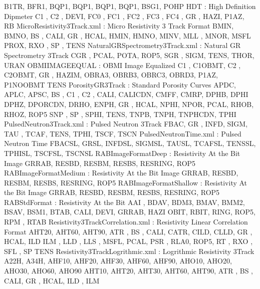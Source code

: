 \documentclass[letterpaper,10pt,english]{sphinxmanual}
\begin{document}
\begin{sphinxVerbatim}[commandchars=\\\{\}]
    B1TR, BFR1, BQP1, BQP1, BQP1, BQP1, BSG1, POHP
HDT                                 : High Definition Dipmeter
    C1  , C2  , DEVI, FC0 , FC1 , FC2 , FC3 , FC4 , GR  , HAZI, P1AZ, RB
Micro\PYGZus{}Resistivity\PYGZus{}3Track.xml        : Micro Resistivity 3 Track Format
    BMIN, BMNO, BS  , CALI, GR  , HCAL, HMIN, HMNO, MINV, MLL , MNOR, MSFL
    PROX, RXO , SP  , TENS
Natural\PYGZus{}GR\PYGZus{}Spectrometry\PYGZus{}3Track.xml  : Natural GR Spectrometry 3Track
    CGR , PCAL, POTA, ROP5, SGR , SIGM, TENS, THOR, URAN
OBMI\PYGZus{}IMAGE\PYGZus{}EQUAL                    : OBMI Image Equalized
    C1  , C1\PYGZus{}OBMT, C2  , C2\PYGZus{}OBMT, GR  , HAZIM, OBRA3, OBRB3, OBRC3, OBRD3, P1AZ, P1NO\PYGZus{}OBMT
    TENS
Porosity\PYGZus{}GR\PYGZus{}3Track                  : Standard Porosity Curves
    APDC, APLC, APSC, BS  , C1  , C2  , CALI, CALI\PYGZus{}CDN, CMFF, CMRP, DPHB, DPHI
    DPHZ, DPOR\PYGZus{}CDN, DRHO, ENPH, GR  , HCAL, NPHI, NPOR, PCAL, RHOB, RHOZ, ROP5
    SNP , SP  , SPHI, TENS, TNPB, TNPH, TNPH\PYGZus{}CDN, TPHI
Pulsed\PYGZus{}Neutron\PYGZus{}3Track.xml           : Pulsed Neutron 3Track
    FBAC, GR  , INFD, SIGM, TAU , TCAF, TENS, TPHI, TSCF, TSCN
Pulsed\PYGZus{}Neutron\PYGZus{}Time.xml             : Pulsed Neutron Time
    FBAC\PYGZus{}SL, GR\PYGZus{}SL, INFD\PYGZus{}SL, SIGM\PYGZus{}SL, TAU\PYGZus{}SL, TCAF\PYGZus{}SL, TENS\PYGZus{}SL, TPHI\PYGZus{}SL, TSCF\PYGZus{}SL, TSCN\PYGZus{}SL
RAB\PYGZus{}Image\PYGZus{}Format\PYGZus{}Deep               : Resistivity At the Bit Image
    GR\PYGZus{}RAB, RES\PYGZus{}BD, RES\PYGZus{}BM, RES\PYGZus{}BS, RES\PYGZus{}RING, ROP5
RAB\PYGZus{}Image\PYGZus{}Format\PYGZus{}Medium             : Resistivity At the Bit Image
    GR\PYGZus{}RAB, RES\PYGZus{}BD, RES\PYGZus{}BM, RES\PYGZus{}BS, RES\PYGZus{}RING, ROP5
RAB\PYGZus{}Image\PYGZus{}Format\PYGZus{}Shallow            : Resistivity At the Bit Image
    GR\PYGZus{}RAB, RES\PYGZus{}BD, RES\PYGZus{}BM, RES\PYGZus{}BS, RES\PYGZus{}RING, ROP5
RAB\PYGZus{}Std\PYGZus{}Format                      : Resistivity At the Bit
    AAI , BDAV, BDM3, BMAV, BMM2, BSAV, BSM1, BTAB, CALI, DEVI, GR\PYGZus{}RAB, HAZI
    OBIT, RBIT, RING, ROP5, RPM , RTAB
Resistivity\PYGZus{}3Track\PYGZus{}Correlation.xml  : Resistivity Linear Correlation Format
    AHT20, AHT60, AHT90, ATR , BS  , CALI, CATR, CILD, CLLD, GR  , HCAL, ILD
    ILM , LLD , LLS , MSFL, PCAL, PSR , RLA0, ROP5, RT  , RXO , SFL , SP
    TENS
Resistivity\PYGZus{}3Track\PYGZus{}Logrithmic.xml   : Logrithmic Resistivity 3Track
    A22H, A34H, AHF10, AHF20, AHF30, AHF60, AHF90, AHO10, AHO20, AHO30, AHO60, AHO90
    AHT10, AHT20, AHT30, AHT60, AHT90, ATR , BS  , CALI, GR  , HCAL, ILD , ILM

\end{sphinxVerbatim}
\end{document}
